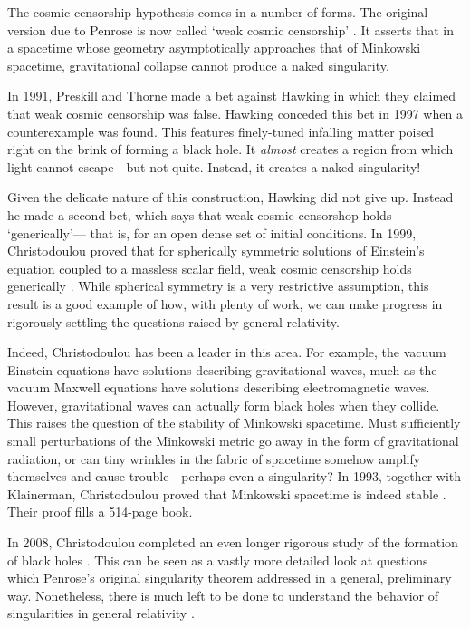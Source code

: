 \documentclass[12pt]{article}
\begin{document}
The cosmic censorship hypothesis comes in a number of forms.    The original version due to Penrose is now called `weak cosmic censorship' \cite{Wald2008}.  It asserts that
in a spacetime whose geometry asymptotically approaches that of Minkowski spacetime, gravitational collapse cannot produce a naked singularity.   

In 1991, Preskill and Thorne made a bet against Hawking in which they claimed that weak cosmic censorship was false.  Hawking conceded this bet in 1997 when a counterexample was found.  This features finely-tuned infalling matter poised right on the brink of forming a black hole.   It \emph{almost} creates a region from which light cannot escape---but not quite.  Instead, it creates a naked singularity!

Given the delicate nature of this construction, Hawking did not give up.  Instead
he made a second bet, which says that weak cosmic censorshop holds `generically'---
that is, for an open dense set of initial conditions.  In 1999, Christodoulou proved that for spherically symmetric solutions of Einstein's equation coupled to a massless scalar field, weak cosmic censorship holds generically \cite{Christodoulou1999}.  While spherical symmetry is a very restrictive assumption, this result is a good example of how, with plenty of work, we can make progress in rigorously settling the questions raised by general relativity.

Indeed, Christodoulou has been a leader in this area.   For example, the vacuum Einstein equations have solutions describing gravitational waves, much as the vacuum Maxwell equations have solutions describing electromagnetic waves.  However, gravitational waves can actually form black holes when they collide.  This raises the question of the stability of Minkowski spacetime.  Must sufficiently small perturbations of the Minkowski metric go away in the form of gravitational radiation, or can tiny wrinkles in the fabric of spacetime somehow amplify themselves and cause trouble---perhaps even a singularity?   In 1993, together with Klainerman, Christodoulou proved that Minkowski spacetime is indeed stable \cite{CK}.  Their proof fills a 514-page book.

In 2008, Christodoulou completed an even longer rigorous study of the formation of black holes \cite{Christodoulou2008}.  This can be seen as a vastly more detailed look at questions which Penrose's original singularity theorem addressed in a general, preliminary way.  Nonetheless, there is much left to be done to understand the behavior of singularities in general relativity \cite{Rendall}.
\end{document}
